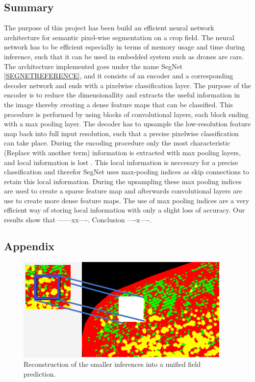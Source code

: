 \documentclass{article}
\begin{document}
\subsection{Summary}
The purpose of this project has been build an efficient neural network architecture for semantic pixel-wise segmentation on a crop field. The neural network has to be efficient especially in terms of memory usage and time during inference, such that it can be used in embedded system such as drones are cars. The architecture implemented goes under the name SegNet \ref{SEGNETREFERENCE}, and it consists of an encoder and a corresponding decoder network and ends with a pixelwise classification layer. The purpose of the encoder is to reduce the dimensionallity and extracts the useful information in the image thereby creating a dense feature maps that can be classified. This procedure is performed by using blocks of convolutional layers, each block ending with a max pooling layer. The decoder has to upsample the low-resolution feature map back into full input resolution, such that a precise pixelwise classification can take place. During the encoding procedure only the most characteristic (Replace with another term) information is extracted with max pooling layers, and local information is lost . This local information is neccesary for a precise classification and therefor SegNet uses max-pooling indices as skip connections to retain this local information. During the upsampling these max pooling indices are used to create a sparse feature map and afterwards convolutional layers are use to create more dense feature maps. The use of max pooling indices are a very efficient way of storing local information with only a slight loss of accuracy. Our results show that ------xx----. Conclusion ----x----.




\subsection{Appendix}
\begin{figure}[h!]
	\centering
	\includegraphics[width=0.7\linewidth]{"reconstruction DL"}
	\caption{Reconstruction of the smaller inferences into a unified field prediction.}
	\label{reconstruction_technique}
\end{figure}
\end{document}
